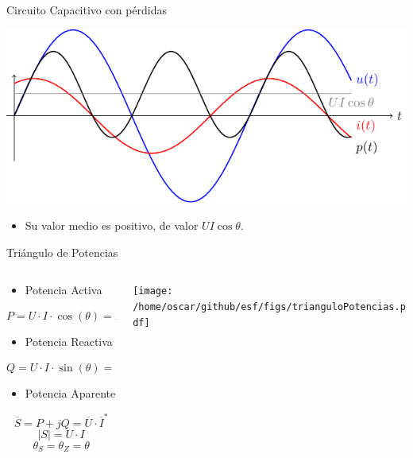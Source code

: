 \documentclass[xcolor={usenames,svgnames,dvipsnames}]{beamer}
\begin{document}
\begin{frame}[label={sec:org8aa114c}]{Circuito Capacitivo con pérdidas}
\begin{center}
\includegraphics[width=.9\linewidth]{../figs/capacitivoPotencia.pdf}
\end{center}

\begin{itemize}
\item Su valor medio es positivo, de valor \(U I \cos \theta\).
\end{itemize}
\end{frame}

\begin{frame}[label={sec:org9e93ed1}]{Triángulo de Potencias}
\begin{columns}
\begin{column}{0.4\columnwidth}
\begin{itemize}
\item Potencia Activa
\end{itemize}
\[  
P = U\cdot I\cdot\cos(\theta) = R \cdot I^2
\]

\begin{itemize}
\item Potencia Reactiva
\end{itemize}
\[
Q = U\cdot I\cdot\sin(\theta) = X \cdot I^2
\]

\begin{itemize}
\item Potencia Aparente
\end{itemize}
\[
\overline{S} = P + jQ = \overline{U} \cdot \overline{I}^*
\]
\[
|S| = U \cdot I
\]
\[
\theta_S = \theta_Z = \theta
\]
\end{column}

\begin{column}{0.6\columnwidth}
\begin{center}
\texttt{[image: /home/oscar/github/esf/figs/trianguloPotencias.pdf]}
\end{center}
\end{column}
\end{columns}
\end{frame}
\end{document}
